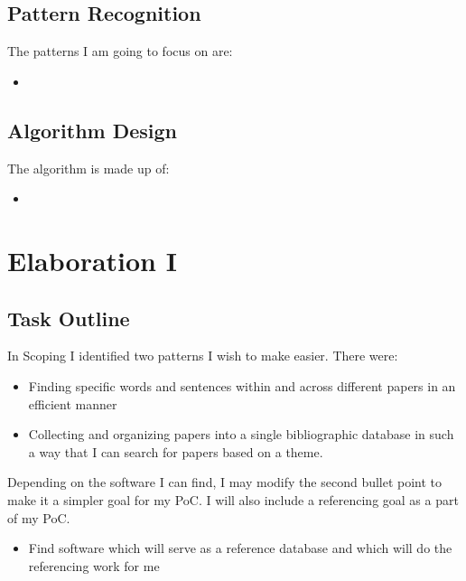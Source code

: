 \documentclass{article}
\begin{document}
\subsection{Pattern Recognition}

The patterns I am going to focus on are:

\begin{itemize}
    \item

\end{itemize}

\subsection{Algorithm Design}

The algorithm is made up of:

\begin{itemize}
    \item

\end{itemize}


\section{Elaboration I}

\subsection{Task Outline}

\noindent
In Scoping I identified two patterns I wish to make easier. There were:

\begin{itemize}
    \item Finding specific words and sentences within and across different papers in an efficient manner
    \item Collecting and organizing papers into a single bibliographic database in such a way that I can search for papers based on a theme.

\end{itemize}

\noindent
Depending on the software I can find, I may modify the second bullet point to make it a simpler goal for my PoC. I will also include a referencing goal as a part of my PoC.

\begin{itemize}
    \item Find software which will serve as a reference database and which will do the referencing work for me 
\end{itemize}
\end{document}

